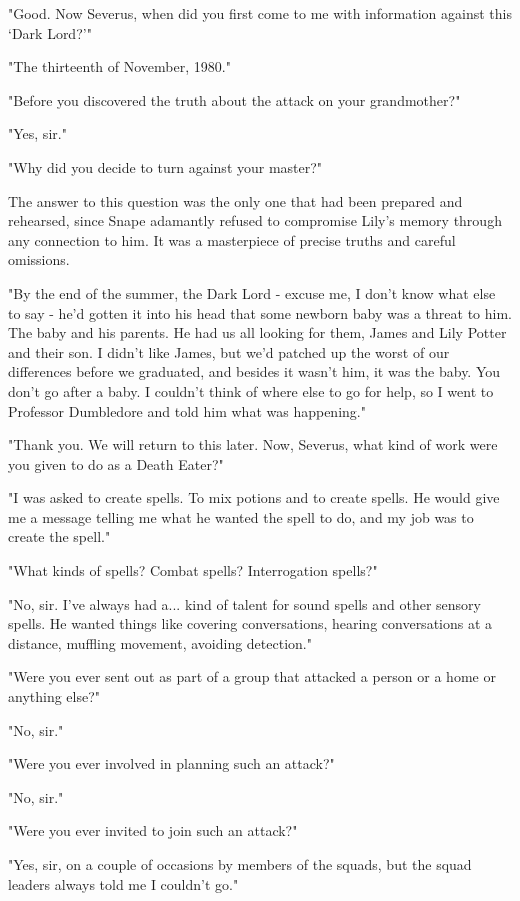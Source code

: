 \documentclass[a4paper,11pt]{article}
\begin{document}
"Good. Now Severus, when did you first come to me with information against this `Dark Lord?'"

"The thirteenth of November, 1980."

"Before you discovered the truth about the attack on your grandmother?"

"Yes, sir."

"Why did you decide to turn against your master?"

The answer to this question was the only one that had been prepared and rehearsed, since Snape adamantly refused to compromise Lily's memory through any connection to him. It was a masterpiece of precise truths and careful omissions.

"By the end of the summer, the Dark Lord - excuse me, I don't know what else to say - he'd gotten it into his head that some newborn baby was a threat to him. The baby and his parents. He had us all looking for them, James and Lily Potter and their son. I didn't like James, but we'd patched up the worst of our differences before we graduated, and besides it wasn't him, it was the baby. You don't go after a baby. I couldn't think of where else to go for help, so I went to Professor Dumbledore and told him what was happening."

"Thank you. We will return to this later. Now, Severus, what kind of work were you given to do as a Death Eater?"

"I was asked to create spells. To mix potions and to create spells. He would give me a message telling me what he wanted the spell to do, and my job was to create the spell."

"What kinds of spells? Combat spells? Interrogation spells?"

"No, sir. I've always had a... kind of talent for sound spells and other sensory spells. He wanted things like covering conversations, hearing conversations at a distance, muffling movement, avoiding detection."

"Were you ever sent out as part of a group that attacked a person or a home or anything else?"

"No, sir."

"Were you ever involved in planning such an attack?"

"No, sir."

"Were you ever invited to join such an attack?"

"Yes, sir, on a couple of occasions by members of the squads, but the squad leaders always told me I couldn't go."
\end{document}
